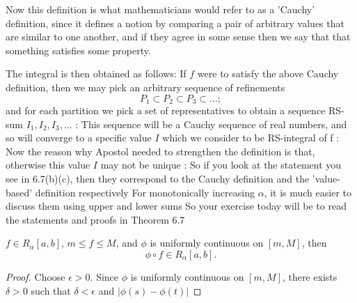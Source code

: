 Now this definition is what mathematicians would refer to as a 'Cauchy' definition, since it defines a notion by comparing a pair of arbitrary values that are similar to one another, and if they agree in some sense then we say that that something satisfies some property.

The integral is then obtained as follows: If $f$ were to satisfy the above Cauchy definition, then we may pick an arbitrary sequence of refinements
\[ P_1 \subset P_2 \subset P_3 \subset ...; \]
and for each partition we pick a set of representatives to obtain a sequence RS-sum
$I_1, I_2, I_3, ...$
:
This sequence will be a Cauchy sequence of real numbers, and so will converge to a specific value $I$ which we consider to be RS-integral of f
:
Now the reason why Apostol needed to strengthen the definition is that, otherwise this value $I$ may not be unique
:
So if you look at the statement you see in 6.7(b)(c), then they correspond to the Cauchy definition and the 'value-based' definition respectively
For monotonically increasing $\alpha$, it is much easier to discuss them using upper and lower sums
So your exercise today will be to read the statements and proofs in Theorem 6.7

\begin{theorem}
$f\in R_\alpha[a,b]$, $m\le f\le M$, and $\phi$ is uniformly continuous on $[m,M]$, then
\[ \phi\circ f\in R_\alpha[a,b]. \]
\end{theorem}

\begin{proof}
Choose $\epsilon>0$. Since $\phi$ is uniformly continuous on $[m,M]$, there exists $\delta>0$ such that $\delta<\epsilon$ and $|\phi(s)-\phi(t)|$
\end{proof}


